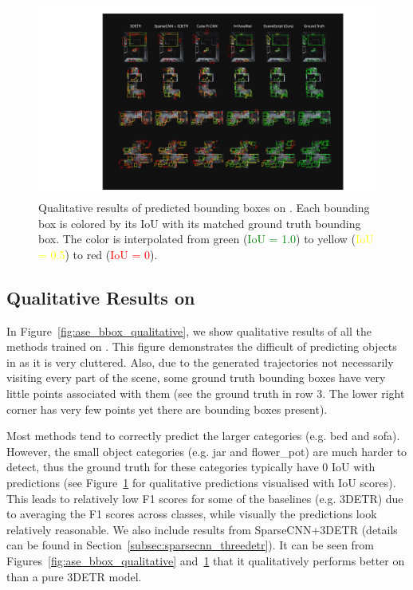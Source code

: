 \begin{figure}[t]
    \centering
    \includegraphics[width=\columnwidth]{figs/ase_bbox_qualitative_iou_compressed.pdf}
    \caption{Qualitative results of predicted bounding boxes on \DatasetName{}. Each bounding box is colored by its IoU with its matched ground truth bounding box. The color is interpolated from green (\textcolor{green}{IoU = 1.0}) to yellow (\textcolor{yellow}{IoU = 0.5}) to red (\textcolor{red}{IoU = 0}).}
    \label{fig:ase_bbox_qualitative_iou}
\end{figure}



\subsection{Qualitative Results on \DatasetName{}}

In Figure~\ref{fig:ase_bbox_qualitative}, we show qualitative results of all the methods trained on \DatasetName{}. This figure demonstrates the difficult of predicting objects in \DatasetName{} as it is very cluttered. Also, due to the generated trajectories not necessarily visiting every part of the scene, some ground truth bounding boxes have very little points associated with them (see the ground truth in row 3. The lower right corner has very few points yet there are bounding boxes present). 

Most methods tend to correctly predict the larger categories (e.g. \textcolor{bed_bbox_color}{bed} and \textcolor{sofa_bbox_color}{sofa}). However, the small object categories (e.g. \textcolor{jar_bbox_color}{jar} and \textcolor{flower_pot_bbox_color}{flower\_pot}) are much harder to detect, thus the ground truth for these categories typically have 0 IoU with predictions (see Figure~\ref{fig:ase_bbox_qualitative_iou} for qualitative predictions visualised with IoU scores). This leads to relatively low F1 scores for some of the baselines (e.g. 3DETR) due to averaging the F1 scores across classes, while visually the predictions look relatively reasonable. We also include results from SparseCNN+3DETR (details can be found in Section~\ref{subsec:sparsecnn_threedetr}). It can be seen from Figures~\ref{fig:ase_bbox_qualitative} and~\ref{fig:ase_bbox_qualitative_iou} that it qualitatively performs better on \DatasetName{} than a pure 3DETR model.




